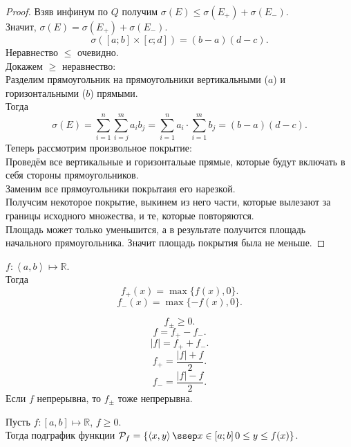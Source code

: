 \documentclass[11pt, oneside]{article}   	%
\begin{document}
\begin{theorem}
\begin{proof}
            Взяв инфинум по $Q$ получим $\sigma(E) \le \sigma(E_{+}) + \sigma(E_{-})$.\\
            Значит, $\sigma(E) = \sigma(E_{+}) + \sigma(E_{-})$.\\
            \[ \sigma([a; b] \times [c; d]) = (b-a)(d-c) .\]
            Неравнество $\le$ очевидно.\\
            Докажем $\ge$ неравнество:\\
            Разделим прямоугольник на прямоугольники вертикальными ($a$) и горизонтальными ($b$) прямыми.\\
            Тогда 
            \[ \sigma(E) = \sum\limits_{i=1}^{n}\sum\limits_{i=j}^{m}a_ib_j = \sum\limits_{i=1}^{n}a_i \cdot \sum\limits_{i=1}^{m} b_j = (b-a)(d-c) .\]
            Теперь рассмотрим произвольное покрытие:\\
            Проведём все вертикальные и горизонтальые прямые, которые будут включать в себя стороны прямоугольников.\\
            Заменим все прямоугольники покрытаия его нарезкой.\\
            Получсим некоторое покрытие, выкинем из него части, которые вылезают за границы исходного множества, и те, которые повторяются.\\
            Площадь может только уменьшится, а в результате получится площадь начального прямоугольника. Значит площадь покрытия была не меньше.
        \end{proof}
    \end{theorem}
    \begin{definition}
        $f: \left<a, b\right> \mapsto \mathbb{R}$.\\
        Тогда 
        \[f_{+}(x) = \max \{f(x), 0\} .\]
        \[ f_{-}(x) = \max \{-f(x), 0\}  .\] 
    \end{definition}
    \begin{dlemma}
        \[f_\pm \ge 0.\]
         \[ f = f_{+} - f_{-} .\]
         \[ |f| = f_{+} + f_{-} .\]
         \[ f_{+} = \frac{|f| + f}{2} .\]
         \[ f_{-} = \frac{|f| - f}{2} .\]
         Если $f$ непрерывна, то $f_\pm$ тоже непрерывна.
    \end{dlemma}
    \begin{definition}
        Пусть $f: \left[a, b\right] \mapsto \mathbb{R}$, $f \ge 0$.\\
        Тогда подграфик функции $\mathcal{P}_f = \{\left<x, y\right>\ssep x\in \left[a; b\right] 0 \le y \le f(x)\} $.\\
    \end{definition}
\end{document}
